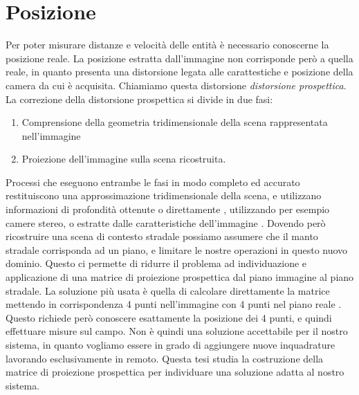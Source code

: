 \section{Posizione}
\label{sec:funzionalita-posizione}
Per poter misurare distanze e velocità delle entità è necessario conoscerne la posizione reale.
La posizione estratta dall'immagine non corrisponde però a quella reale, in quanto presenta una distorsione legata alle carattestiche e posizione della camera da cui è acquisita.
Chiamiamo questa distorsione \emph{distorsione prospettica}.
La correzione della distorsione prospettica si divide in due fasi:
\begin{enumerate}
    \item Comprensione della geometria tridimensionale della scena rappresentata nell'immagine
    \item Proiezione dell'immagine sulla scena ricostruita.
\end{enumerate}
Processi che eseguono entrambe le fasi in modo completo ed accurato restituiscono una approssimazione tridimensionale della scena, e utilizzano informazioni di profondità ottenute o direttamente \cite{persp:depth}, utilizzando per esempio camere stereo, o estratte dalle caratteristiche dell'immagine \cite{svm}.
Dovendo però ricostruire una scena di contesto stradale possiamo assumere che il manto stradale corrisponda ad un piano, e limitare le nostre operazioni in questo nuovo dominio.
Questo ci permette di ridurre il problema ad individuazione e applicazione di una matrice di proiezione prospettica dal piano immagine al piano stradale.
La soluzione più usata è quella di calcolare direttamente la matrice mettendo in corrispondenza 4 punti nell'immagine con 4 punti nel piano reale \cite{persp:map}.
Questo richiede però conoscere esattamente la posizione dei 4 punti, e quindi effettuare misure sul campo.
Non è quindi una soluzione accettabile per il nostro sistema, in quanto vogliamo essere in grado di aggiungere nuove inquadrature lavorando esclusivamente in remoto.
Questa tesi studia la costruzione della matrice di proiezione prospettica per individuare una soluzione adatta al nostro sistema.

